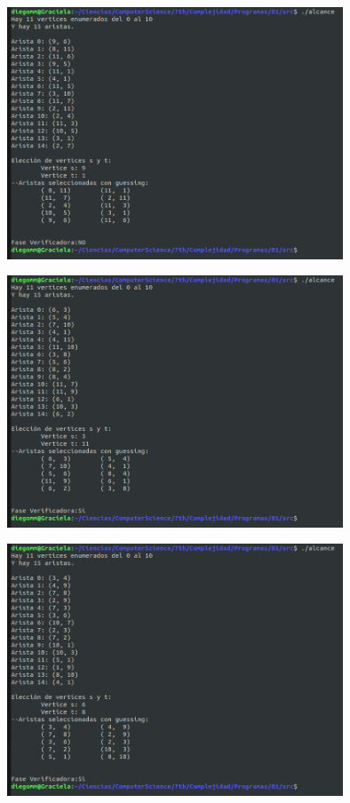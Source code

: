 \documentclass[14pt,letterpaper]{article}
\begin{document}
\begin{itemize}
\begin{enumerate}
    \begin{figure}[h]
      \includegraphics[width=10cm]{alcance_2.png}
      \centering
    \end{figure}

    \hfill\break
    
    \begin{figure}[h]
      \includegraphics[width=10cm]{alcance_3.png}
      \centering
    \end{figure}

    \hfill\break
    
    \begin{figure}[h]
      \includegraphics[width=10cm]{alcance_4.png}
      \centering
    \end{figure}


\end{enumerate}
\end{itemize}
\end{document}
